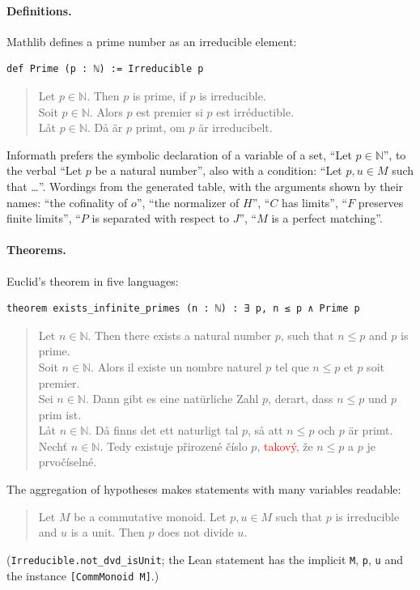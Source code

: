 \documentclass{easychair}
\newcommand{\ttt}[1]{\texttt{#1}}
\newcommand{\reading}[1]{\begin{quote}\small #1\end{quote}}
\begin{document}
\paragraph{Definitions.} Mathlib defines a prime number as an irreducible element:
\begin{lstlisting}
def Prime (p : ℕ) := Irreducible p
\end{lstlisting}
\reading{Let $p \in \mathbb{N}$. Then $p$ is prime, if $p$ is irreducible.\\
Soit $p \in \mathbb{N}$. Alors $p$ est premier si $p$ est irréductible.\\
Låt $p \in \mathbb{N}$. Då är $p$ primt, om $p$ är irreducibelt.}
\noindent Informath prefers the symbolic declaration of a variable of a set, ``Let $p \in
\mathbb{N}$'', to the verbal ``Let $p$ be a natural number'', also with a condition: ``Let $p,
u \in M$ such that \ldots''.
\noindent Wordings from the generated table, with the arguments shown by their names:
``the cofinality of $o$'', ``the normalizer of $H$'', ``$C$ has limits'', ``$F$ preserves
finite limits'', ``$P$ is separated with respect to $J$'', ``$M$ is a perfect matching''.

\paragraph{Theorems.} Euclid's theorem in five languages:
\begin{lstlisting}
theorem exists_infinite_primes (n : ℕ) : ∃ p, n ≤ p ∧ Prime p
\end{lstlisting}
\reading{Let $n \in \mathbb{N}$. Then there exists a natural number $p$, such that
$n \leq p$ and $p$ is prime.\\
Soit $n \in \mathbb{N}$. Alors il existe un nombre naturel $p$ tel que $n \leq p$ et $p$ soit
premier.\\
Sei $n \in \mathbb{N}$. Dann gibt es eine natürliche Zahl $p$, derart, dass $n \leq p$
und $p$ prim ist.\\
Låt $n \in \mathbb{N}$. Då finns det ett naturligt tal $p$, så att $n \leq p$ och $p$
är primt.\\
Nechť $n \in \mathbb{N}$. Tedy existuje přirozené číslo $p$, \textcolor{red}{takový}, že
$n \leq p$ a $p$ je prvočíselné.}
\noindent The aggregation of hypotheses makes statements with many variables readable:
\reading{Let $M$ be a commutative monoid. Let $p, u \in M$ such that $p$ is irreducible and
$u$ is a unit. Then $p$ does not divide $u$.}
\noindent (\ttt{Irreducible.not\_dvd\_isUnit}; the Lean statement has the implicit \ttt{M},
\ttt{p}, \ttt{u} and the instance \ttt{[CommMonoid M]}.)
\end{document}

